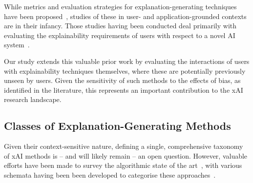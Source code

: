 While metrics and evaluation strategies for explanation-generating techniques have been proposed~\cite{doshi2017towards, HolzingerEtAl:2019:Wiley-Paper, HolzingerEtAl:2020:QualityOfExplanations}, studies of these in user- and application-grounded contexts are in their infancy. Those studies having been conducted deal primarily with evaluating the explainability requirements of users with respect to a novel AI system~\cite{liao2020questioning, cai2019hello}.


Our study extends this valuable prior work by evaluating the interactions of users with explainability techniques themselves, where these are potentially previously unseen by users. Given the sensitivity of such methods to the effects of bias, as identified in the literature, this represents an important contribution to the xAI research landscape.



\subsection{Classes of Explanation-Generating Methods}
\label{sec:related:classes}

Given their context-sensitive nature, defining a single, comprehensive taxonomy of xAI methods is -- and will likely remain -- an open question. However, valuable efforts have been made to survey the algorithmic state of the art~\cite{tjoa_survey_2020, deshpande2021}, with various schemata having been been developed to categorise these approaches~\cite{arrieta2020explainable}.

